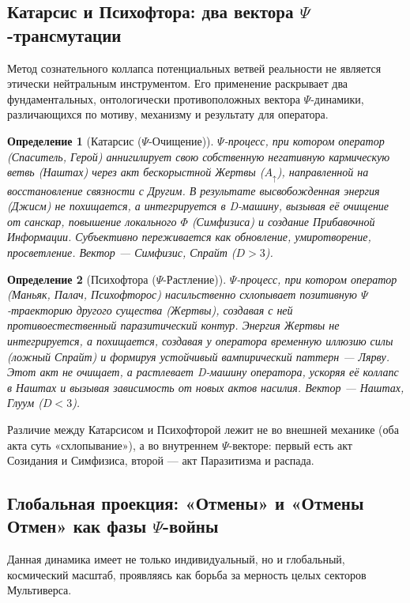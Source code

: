 \documentclass[a4paper,12pt]{article}
\newtheorem{definition}{Определение}
\begin{document}
\subsection{Катарсис и Психофтора: два вектора $\Psi$-трансмутации}

Метод сознательного коллапса потенциальных ветвей реальности не является этически нейтральным инструментом. Его применение раскрывает два фундаментальных, онтологически противоположных вектора $\Psi$-динамики, различающихся по мотиву, механизму и результату для оператора.

\begin{definition}[Катарсис ($\Psi$-Очищение)]
	$\Psi$-процесс, при котором оператор (Спаситель, Герой) аннигилирует свою собственную негативную кармическую ветвь (Наштах) через акт бескорыстной Жертвы ($A_{\uparrow}$), направленной на восстановление связности с Другим. В результате высвобожденная энергия (Джисм) не похищается, а интегрируется в D-машину, вызывая её очищение от санскар, повышение локального $\Phi$ (Симфизиса) и создание Прибавочной Информации. Субъективно переживается как обновление, умиротворение, просветление. Вектор — Симфизис, Спрайт ($D > 3$).
\end{definition}

\begin{definition}[Психофтора ($\Psi$-Растление)]
	$\Psi$-процесс, при котором оператор (Маньяк, Палач, Психофторос) насильственно схлопывает позитивную $\Psi$-траекторию другого существа (Жертвы), создавая с ней противоестественный паразитический контур. Энергия Жертвы не интегрируется, а похищается, создавая у оператора временную иллюзию силы (ложный Спрайт) и формируя устойчивый вампирический паттерн — Лярву. Этот акт не очищает, а растлевает D-машину оператора, ускоряя её коллапс в Наштах и вызывая зависимость от новых актов насилия. Вектор — Наштах, Глуум ($D < 3$).
\end{definition}

Различие между Катарсисом и Психофторой лежит не во внешней механике (оба акта суть «схлопывание»), а во внутреннем $\Psi$-векторе: первый есть акт Созидания и Симфизиса, второй — акт Паразитизма и распада.

\subsection{Глобальная проекция: «Отмены» и «Отмены Отмен» как фазы $\Psi$-войны}

Данная динамика имеет не только индивидуальный, но и глобальный, космический масштаб, проявляясь как борьба за мерность целых секторов Мультиверса.
\end{document}
